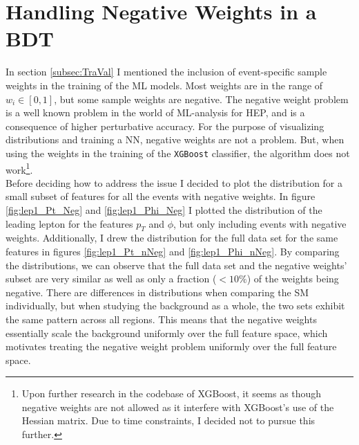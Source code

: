 \section{Handling Negative Weights in a BDT}\label{subsec:negWeights}
In section \ref{subsec:TraVal} I mentioned the inclusion of event-specific sample weights in the training 
of the \ac{ML} models. Most weights are in the range of $w_i \in [0,1]$, but some sample weights are negative.
The negative weight problem is a well known problem in the world of \ac{ML}-analysis for \ac{HEP}, 
and is a consequence of higher perturbative accuracy. For the purpose of visualizing 
distributions and training a \ac{NN}, negative weights are not a problem. But, when using 
the weights in the training of the \verb!XGBoost! classifier, the algorithm does not work\footnote{Upon further research 
in the codebase of XGBoost, it seems as though negative weights are not allowed as it interfere with XGBoost's use 
of the Hessian matrix. Due to time constraints, I decided not to  pursue this further.}.  
\\
Before deciding how to address the issue I decided to plot the distribution for 
a small subset of features for all the events with negative weights.
In figure \ref{fig:lep1_Pt_Neg} and \ref{fig:lep1_Phi_Neg} I plotted the distribution of the leading 
lepton for the features $p_T$ and $\phi$, but only including events with negative weights.
Additionally, I drew the distribution for the full data set for the same features in figures \ref{fig:lep1_Pt_nNeg}
and \ref{fig:lep1_Phi_nNeg}. By comparing the distributions, we can observe that the full data set and the 
negative weights' subset are very similar as well as only a fraction ($<10\%$) of the weights being negative.  
There are differences in distributions when comparing the \ac{SM} individually, but when studying the 
background as a whole, the two sets exhibit the same pattern across all regions. This means that the negative 
weights essentially scale the background uniformly over the full feature space, which motivates treating the 
negative weight problem uniformly over the full feature space.
